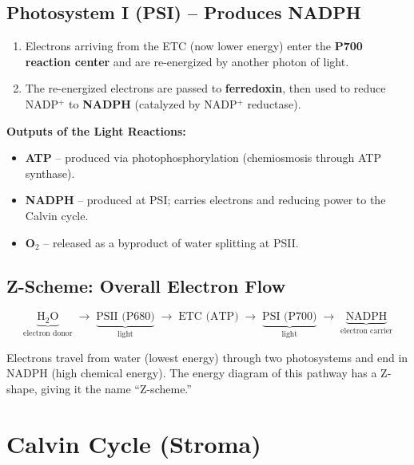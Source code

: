 \documentclass[11pt, letterpaper]{article}
\begin{document}
\subsection*{Photosystem I (PSI) -- Produces NADPH}

\begin{enumerate}[noitemsep]
  \item Electrons arriving from the ETC (now lower energy) enter the \textbf{P700 reaction center} and are re-energized by another photon of light.
  \item The re-energized electrons are passed to \textbf{ferredoxin}, then used to reduce NADP$^+$ to \textbf{NADPH} (catalyzed by NADP$^+$ reductase).
\end{enumerate}

\begin{tcolorbox}[colback=part2bg, colframe=sectiongreen, arc=3pt, boxrule=1pt]
\textbf{Outputs of the Light Reactions:}
\begin{itemize}[noitemsep, leftmargin=*]
  \item \textbf{ATP} -- produced via photophosphorylation (chemiosmosis through ATP synthase).
  \item \textbf{NADPH} -- produced at PSI; carries electrons and reducing power to the Calvin cycle.
  \item \textbf{O$_2$} -- released as a byproduct of water splitting at PSII.
\end{itemize}
\end{tcolorbox}

\subsection*{Z-Scheme: Overall Electron Flow}

\[
  \underbrace{\text{H}_2\text{O}}_{\text{electron donor}} \;\longrightarrow\; \underbrace{\text{PSII (P680)}}_{\text{light}} \;\longrightarrow\; \text{ETC (ATP)} \;\longrightarrow\; \underbrace{\text{PSI (P700)}}_{\text{light}} \;\longrightarrow\; \underbrace{\text{NADPH}}_{\text{electron carrier}}
\]

Electrons travel from water (lowest energy) through two photosystems and end in NADPH (high chemical energy). The energy diagram of this pathway has a Z-shape, giving it the name ``Z-scheme.''

\section*{Calvin Cycle (Stroma)}
\end{document}
